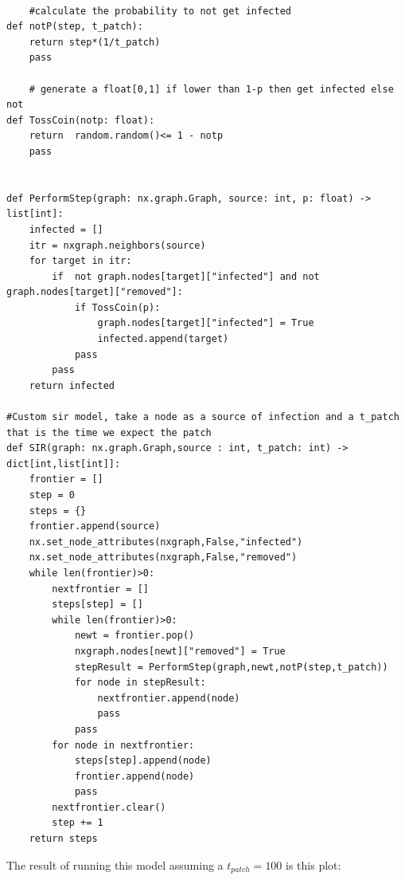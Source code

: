 \documentclass[]{article}
\begin{document}
    \begin{verbatim}

    #calculate the probability to not get infected
def notP(step, t_patch):
    return step*(1/t_patch)
    pass

    # generate a float[0,1] if lower than 1-p then get infected else not
def TossCoin(notp: float):
    return  random.random()<= 1 - notp
    pass


def PerformStep(graph: nx.graph.Graph, source: int, p: float) -> list[int]:
    infected = []
    itr = nxgraph.neighbors(source)
    for target in itr:
        if  not graph.nodes[target]["infected"] and not graph.nodes[target]["removed"]:
            if TossCoin(p):
                graph.nodes[target]["infected"] = True
                infected.append(target)
            pass
        pass
    return infected

#Custom sir model, take a node as a source of infection and a t_patch that is the time we expect the patch
def SIR(graph: nx.graph.Graph,source : int, t_patch: int) -> dict[int,list[int]]:
    frontier = []
    step = 0
    steps = {}
    frontier.append(source)
    nx.set_node_attributes(nxgraph,False,"infected")
    nx.set_node_attributes(nxgraph,False,"removed")
    while len(frontier)>0:
        nextfrontier = []
        steps[step] = []
        while len(frontier)>0:
            newt = frontier.pop()
            nxgraph.nodes[newt]["removed"] = True
            stepResult = PerformStep(graph,newt,notP(step,t_patch))
            for node in stepResult:
                nextfrontier.append(node)
                pass
            pass
        for node in nextfrontier:
            steps[step].append(node)
            frontier.append(node)
            pass
        nextfrontier.clear()
        step += 1
    return steps

    \end{verbatim}

    The result of running this model assuming a $t_{patch} = 100$ is this plot:
    
\end{document}
